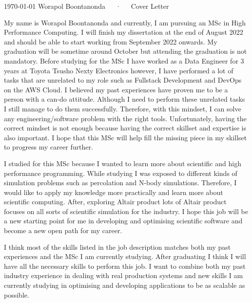 \documentclass[11pt, a4paper]{awesome-cv}
\begin{document}
\makecvheader[R]

\makecvfooter
  {\today}
  {Worapol Boontanonda~~~·~~~Cover Letter}
  {}

\makelettertitle

\begin{cvletter}

My name is Worapol Boontanonda and currently, I am pursuing an MSc in High Performance Computing.
I will finish my dissertation at the end of August 2022 and should be able to start working from
September 2022 onwards. My graduation will be sometime around October but attending the graduation is not mandatory.
Before studying for the MSc I have worked as a Data Engineer for 3 years at Toyota Tsusho Nexty Electronics 
however, I have performed a lot of tasks that are unrelated to my role such as Fullstack Development 
and DevOps on the AWS Cloud. I believed my past experiences have proven me to be a person 
with a can-do attitude. Although I need to perform these unrelated tasks I still manage to do them successfully. 
Therefore, with this mindset, I can solve any engineering/software problem with the right tools. 
Unfortunately, having the correct mindset is not enough 
because having the correct skillset and expertise is also important. 
I hope that this MSc will help fill the missing piece in my skillset to progress my career further.

I studied for this MSc because I wanted to learn more about scientific and high performance programming.
While studying I was exposed to different kinds of simulation problems such as percolation and N-body simulations.
Therefore, I would like to apply my knowledge more practically and learn more about scientific computing.
After, exploring Altair product lots of Altair product focuses on all sorts of scientific simulation for
the industry. I hope this job will be a new starting point for me in developing and optimising scientific
software and become a new open path for my career.

I think most of the skills listed in the job description matches both my past experiences and the MSc I am currently
studying. After graduating I think I will have all the necessary skills to perform this job. I want to combine
both my past industry experience in dealing with real production systems and new skills I am currently studying 
in optimising and developing applications to be as scalable as possible.

\end{cvletter}


\makeletterclosing
\end{document}
